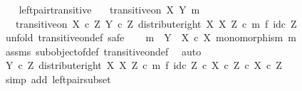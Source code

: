 \begin{isabellebody}
\ \ \isamarkupfalse%
\isanewline
{}\isamarkupfalse%
%
\endisatagproof
{\isafoldproof}%
%
\isadelimproof
\isanewline
%
\endisadelimproof
\isanewline
{}\isamarkupfalse%
\ left{\isacharunderscore}{\kern0pt}pair{\isacharunderscore}{\kern0pt}transitive{\isacharcolon}{\kern0pt}\isanewline
\ \ \ {\isachardoublequoteopen}transitive{\isacharunderscore}{\kern0pt}on\ X\ {\isacharparenleft}{\kern0pt}Y{\isacharcomma}{\kern0pt}\ m{\isacharparenright}{\kern0pt}{\isachardoublequoteclose}\isanewline
\ \ \ {\isachardoublequoteopen}transitive{\isacharunderscore}{\kern0pt}on\ {\isacharparenleft}{\kern0pt}X\ {\isasymtimes}\isactrlsub c\ Z{\isacharparenright}{\kern0pt}\ {\isacharparenleft}{\kern0pt}Y\ {\isasymtimes}\isactrlsub c\ Z{\isacharcomma}{\kern0pt}\ distribute{\isacharunderscore}{\kern0pt}right\ X\ X\ Z\ {\isasymcirc}\isactrlsub c\ {\isacharparenleft}{\kern0pt}m\ {\isasymtimes}\isactrlsub f\ id\isactrlsub c\ Z{\isacharparenright}{\kern0pt}{\isacharparenright}{\kern0pt}{\isachardoublequoteclose}\isanewline
%
\isadelimproof
%
\endisadelimproof
%
\isatagproof
{}\isamarkupfalse%
\ {\isacharparenleft}{\kern0pt}unfold\ transitive{\isacharunderscore}{\kern0pt}on{\isacharunderscore}{\kern0pt}def{\isacharcomma}{\kern0pt}\ safe{\isacharparenright}{\kern0pt}\isanewline
\ \ \isamarkupfalse%
\ {\isachardoublequoteopen}m\ {\isacharcolon}{\kern0pt}\ Y\ {\isasymrightarrow}\ X\ {\isasymtimes}\isactrlsub c\ X{\isachardoublequoteclose}\ {\isachardoublequoteopen}monomorphism\ m{\isachardoublequoteclose}\isanewline
\ \ \ \ \isamarkupfalse%
\ assms\ subobject{\isacharunderscore}{\kern0pt}of{\isacharunderscore}{\kern0pt}def{}\ transitive{\isacharunderscore}{\kern0pt}on{\isacharunderscore}{\kern0pt}def\ \isamarkupfalse%
\ auto\isanewline
\ \ \isamarkupfalse%
\ \isamarkupfalse%
\ {\isachardoublequoteopen}{\isacharparenleft}{\kern0pt}Y\ {\isasymtimes}\isactrlsub c\ Z{\isacharcomma}{\kern0pt}\ distribute{\isacharunderscore}{\kern0pt}right\ X\ X\ Z\ {\isasymcirc}\isactrlsub c\ m\ {\isasymtimes}\isactrlsub f\ id\isactrlsub c\ Z{\isacharparenright}{\kern0pt}\ {\isasymsubseteq}\isactrlsub c\ {\isacharparenleft}{\kern0pt}X\ {\isasymtimes}\isactrlsub c\ Z{\isacharparenright}{\kern0pt}\ {\isasymtimes}\isactrlsub c\ X\ {\isasymtimes}\isactrlsub c\ Z{\isachardoublequoteclose}\isanewline
\ \ \ \ \isamarkupfalse%
\ {\isacharparenleft}{\kern0pt}simp\ add{\isacharcolon}{\kern0pt}\ left{\isacharunderscore}{\kern0pt}pair{\isacharunderscore}{\kern0pt}subset{\isacharparenright}{\kern0pt}\isanewline

\end{isabellebody}
